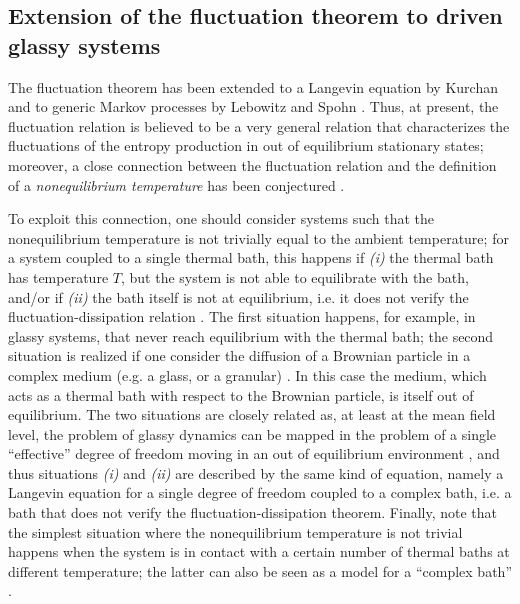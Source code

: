 \documentclass[pre,aps]{revtex4}
\newcommand{\ie}{i.e. }
\newcommand{\eg}{e.g. }
\begin{document}
\subsection{Extension of the fluctuation theorem to driven glassy systems}

The fluctuation theorem has been extended to a Langevin equation by Kurchan \cite{Ku98} and
to generic Markov processes by Lebowitz and Spohn \cite{LS99}.
Thus, at present, the fluctuation relation is believed to be a very general relation that characterizes
the fluctuations of the entropy production in out of equilibrium stationary states; moreover,
a close connection between the fluctuation relation and the definition of a 
{\it nonequilibrium temperature} has been conjectured \cite{Ga04,CR04,SCM04,Se98}.

To exploit this connection, one should consider systems such that the nonequilibrium temperature
is not trivially equal to the ambient temperature; 
for a system coupled to a single thermal bath, this happens if 
{\it (i)} the thermal bath has temperature $T$, but the system is not able to equilibrate with
the bath, and/or if {\it (ii)} the bath itself
is not at equilibrium, \ie it does not verify the fluctuation-dissipation relation \cite{Cu02}.
The first situation happens, for example, in glassy systems, that never reach equilibrium with
the thermal bath; the second situation is realized if one consider the diffusion of a Brownian
particle in a complex medium (\eg a glass, or a granular) \cite{PM04,Po04,AG04}.
In this case the medium, which acts as
a thermal bath with respect to the Brownian particle, is itself out of equilibrium.
The two situations are closely related as, at least at the mean field level, the problem of 
glassy dynamics can be mapped in the problem of a single ``effective'' degree of freedom moving 
in an out of equilibrium environment \cite{Cu02,CK99}, 
and thus situations {\it (i)} and {\it (ii)} are described
by the same kind of equation, namely a Langevin equation for a single degree of freedom coupled
to a complex bath, \ie a bath that does not verify the fluctuation-dissipation theorem.
Finally, note that the simplest situation where the nonequilibrium temperature is not trivial
happens when the system is in contact with a certain number of thermal baths at different 
temperature; the latter can also be seen as a model for a ``complex bath'' \cite{CK99}.
\end{document}
